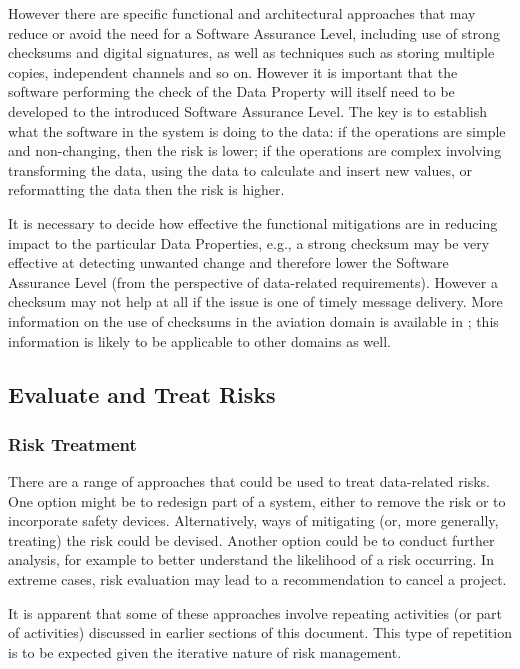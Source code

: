However there are specific functional and architectural approaches that may reduce or avoid the need for a Software Assurance Level, including use of strong checksums and digital signatures, as well as techniques such as storing multiple copies, independent channels and so on. However it is important that the software performing the check of the Data Property will itself need to be developed to the introduced Software Assurance Level. The key is to establish what the software in the system is doing to the data: if the operations are simple and non-changing, then the risk is lower; if the operations are complex involving transforming the data, using the data to calculate and insert new values, or reformatting the data then the risk is higher.

It is necessary to decide how effective the functional mitigations are in reducing impact to the particular Data Properties, e.g., a strong checksum may be very effective at detecting unwanted change and therefore lower the Software Assurance Level (from the perspective of data-related requirements). However a checksum may not help at all if the issue is one of timely message delivery. More information on the use of checksums in the aviation domain is available in \cite{citation:koopman2015selection}; this information is likely to be applicable to other domains as well.

\clearpage %
\subsection{Evaluate and Treat Risks}
\label{bkm:EvaluateAndTreat}
\subsubsection{Risk Treatment}
There are a range of approaches that could be used to treat data-related risks. One option might be to redesign part of a system, either to remove the risk or to incorporate safety devices. Alternatively, ways of mitigating (or, more generally, treating) the risk could be devised. Another option could be to conduct further analysis, for example to better understand the likelihood of a risk occurring. In extreme cases, risk evaluation may lead to a recommendation to cancel a project.

It is apparent that some of these approaches involve repeating activities (or part of activities) discussed in earlier sections of this document. This type of repetition is to be expected given the iterative nature of risk management.

